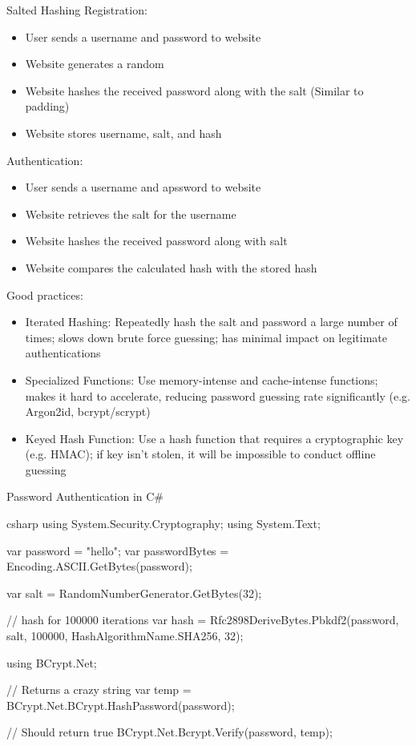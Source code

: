 \documentclass[12pt]{report}
\begin{document}
\begin{exbox}{Salted Hashing}{}
    Registration:
    \begin{itemize}[noitemsep]
        \item User sends a username and password to website
        \item Website generates a random 
        \item Website hashes the received password along with the salt (Similar to padding)
        \item Website stores username, salt, and hash
    \end{itemize}
    Authentication:
    \begin{itemize}[noitemsep]
        \item User sends a username and apssword to website
        \item Website retrieves the salt for the username
        \item Website hashes the received password along with salt
        \item Website compares the calculated hash with the stored hash
    \end{itemize}
\end{exbox}

Good practices:
\begin{itemize}[noitemsep]
    \item Iterated Hashing: Repeatedly hash the salt and password a large number of times; slows down brute force guessing; has minimal impact on legitimate authentications
    \item Specialized Functions: Use memory-intense and cache-intense functions; makes it hard to accelerate, reducing password guessing rate significantly (e.g. Argon2id, bcrypt/scrypt)
    \item Keyed Hash Function: Use a hash function that requires a cryptographic key (e.g. HMAC); if key isn't stolen, it will be impossible to conduct offline guessing
\end{itemize}

\begin{codebox}{Password Authentication in C\#}{}{}
    \begin{amzcode}{csharp}
using System.Security.Cryptography;
using System.Text;

var password = "hello";
var passwordBytes = Encoding.ASCII.GetBytes(password);

var salt = RandomNumberGenerator.GetBytes(32);

// hash for 100000 iterations
var hash = Rfc2898DeriveBytes.Pbkdf2(password, salt, 100000, HashAlgorithmName.SHA256, 32);

using BCrypt.Net;

// Returns a crazy string
var temp = BCrypt.Net.BCrypt.HashPassword(password);

// Should return true
BCrypt.Net.Bcrypt.Verify(password, temp);
    \end{amzcode}
\end{codebox}
\end{document}
